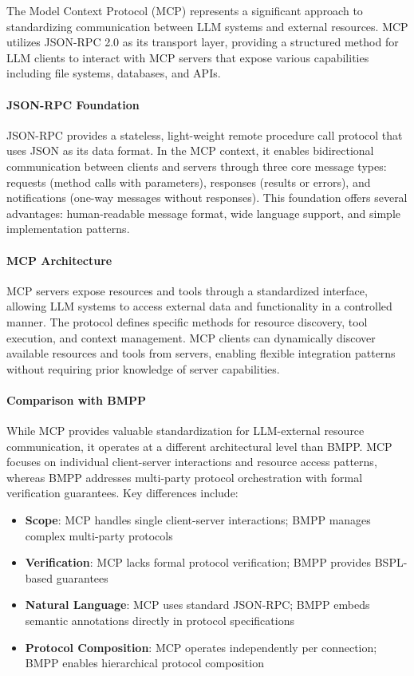 \documentclass[11pt,a4paper]{article}
\begin{document}
	The Model Context Protocol (MCP) represents a significant approach to standardizing communication between LLM systems and external resources. MCP utilizes JSON-RPC 2.0 as its transport layer, providing a structured method for LLM clients to interact with MCP servers that expose various capabilities including file systems, databases, and APIs.
	
	\paragraph{JSON-RPC Foundation} JSON-RPC provides a stateless, light-weight remote procedure call protocol that uses JSON as its data format. In the MCP context, it enables bidirectional communication between clients and servers through three core message types: requests (method calls with parameters), responses (results or errors), and notifications (one-way messages without responses). This foundation offers several advantages: human-readable message format, wide language support, and simple implementation patterns.
	
	\paragraph{MCP Architecture} MCP servers expose resources and tools through a standardized interface, allowing LLM systems to access external data and functionality in a controlled manner. The protocol defines specific methods for resource discovery, tool execution, and context management. MCP clients can dynamically discover available resources and tools from servers, enabling flexible integration patterns without requiring prior knowledge of server capabilities.
	
	\paragraph{Comparison with BMPP} While MCP provides valuable standardization for LLM-external resource communication, it operates at a different architectural level than BMPP. MCP focuses on individual client-server interactions and resource access patterns, whereas BMPP addresses multi-party protocol orchestration with formal verification guarantees. Key differences include:
	
	\begin{itemize}
		\item \textbf{Scope}: MCP handles single client-server interactions; BMPP manages complex multi-party protocols
		\item \textbf{Verification}: MCP lacks formal protocol verification; BMPP provides BSPL-based guarantees
		\item \textbf{Natural Language}: MCP uses standard JSON-RPC; BMPP embeds semantic annotations directly in protocol specifications
		\item \textbf{Protocol Composition}: MCP operates independently per connection; BMPP enables hierarchical protocol composition
	\end{itemize}
	
\end{document}
